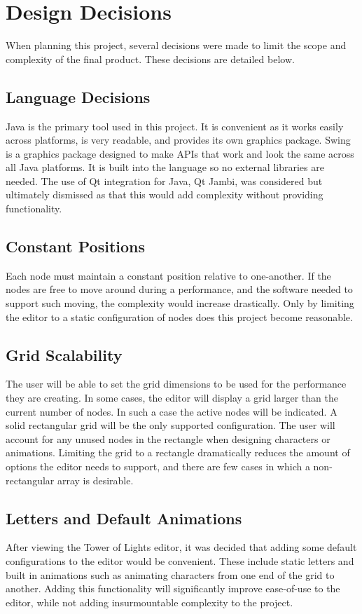 \documentclass[12pt]{article}
\begin{document}
	\section{Design Decisions}
    When planning this project, several decisions were made to limit the scope and complexity of the final product. These decisions are detailed below. 
    
  	\subsection{Language Decisions}
    	Java is the primary tool used in this project. It is convenient as it works easily across platforms, is very readable, and provides its own graphics package. Swing is a graphics package designed to make APIs that work and look the same across all Java platforms. It is built into the language so no external libraries are needed. The use of Qt integration for Java, Qt Jambi, was considered but ultimately dismissed as that this would add complexity without providing functionality. 
      
  	\subsection{Constant Positions}
    	Each node must maintain a constant position relative to one-another. If the nodes are free to move around during a performance, and the software needed to support such moving, the complexity would increase drastically. Only by limiting the editor to a static configuration of nodes does this project become reasonable. 
      
  	\subsection{Grid Scalability}
    	The user will be able to set the grid dimensions to be used for the performance they are creating. In some cases, the editor will display a grid larger than the current number of nodes. In such a case the active nodes will be indicated. A solid rectangular grid will be the only supported configuration. The user will account for any unused nodes in the rectangle when designing characters or animations. Limiting the grid to a rectangle dramatically reduces the amount of options the editor needs to support, and there are few cases in which a non-rectangular array is desirable.
      
  	\subsection{Letters and Default Animations}
    	After viewing the Tower of Lights editor, it was decided that adding some default configurations to the editor would be convenient. These include static letters and built in animations such as animating characters from one end of the grid to another. Adding this functionality will significantly improve ease-of-use to the editor, while not adding insurmountable complexity to the project. 
      
\end{document}
